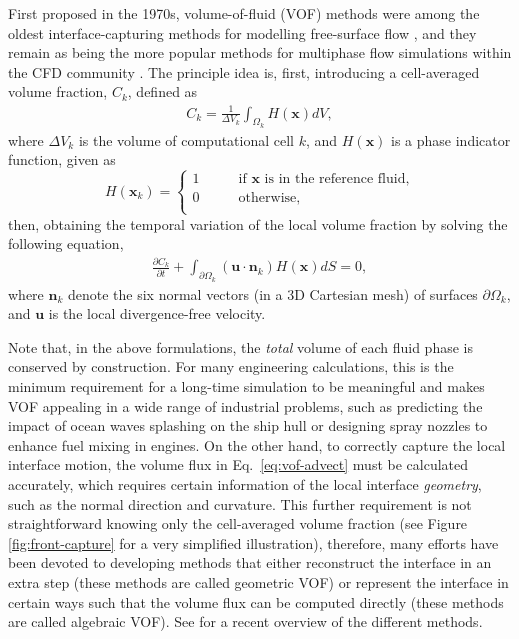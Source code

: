 First proposed in the 1970s, volume-of-fluid (VOF) methods were among the oldest interface-capturing methods for modelling free-surface flow \citep{Debar1974, hirt_nichols_1975, hirt_nichols_1981a}, and they remain as being the more popular methods for multiphase flow simulations within the CFD community \citep{Scardovelli_Zaleski_1999, gerris, pilliod_puckett_2004, xiao_honma_kono_2005a, mthinc2012, paris2019}.
The principle idea is, first, introducing a cell-averaged volume fraction, $C_{k}$, defined as
\begin{equation}
 \begin{aligned}
   C_{k} = \frac{1}{\Delta V_k} \int_{\Omega_k} H(\bm{x}) dV,
 \end{aligned}
\end{equation}
where $\Delta V_k$ is the volume of computational cell $k$, and $H(\bm{x})$ is a phase indicator function, given as
\begin{equation}
    H(\bm{x}_k)=
    \begin{cases}
        1 \quad \quad & \textrm{if $\bm{x}$ is in the reference fluid,} \\
        0 \quad & \textrm{otherwise}, \\
    \end{cases}
\end{equation}
then, obtaining the temporal variation of the local volume fraction by solving the following equation,
\begin{equation} \label{eq:vof-advect}
 \begin{aligned}
   \frac{\partial C_{k}}{\partial t} + \int_{\partial \Omega_k} (\bm{u \cdot n}_k) H(\bm{x}) dS =0,
 \end{aligned}
\end{equation}
where $\bm{n}_k$ denote the six normal vectors (in a 3D Cartesian mesh) of surfaces $\partial \Omega_k$, and $\bm u$ is the local divergence-free velocity.

Note that, in the above formulations, the \emph{total} volume of each fluid phase is conserved by construction.
For many engineering calculations, this is the minimum requirement for a long-time simulation to be meaningful and makes VOF appealing in a wide range of industrial problems, such as predicting the impact of ocean waves splashing on the ship hull or designing spray nozzles to enhance fuel mixing in engines.
On the other hand, to correctly capture the local interface motion, the volume flux in Eq.\ \eqref{eq:vof-advect} must be calculated accurately, which requires certain information of the local interface \emph{geometry}, such as the normal direction and curvature.
This further requirement is not straightforward knowing only the cell-averaged volume fraction (see Figure \ref{fig:front-capture} for a very simplified illustration), therefore, many efforts have been devoted to developing methods that either reconstruct the interface in an extra step (these methods are called geometric VOF) or represent the interface in certain ways such that the volume flux can be computed directly (these methods are called algebraic VOF). See \cite{mirjalili_jain_dodd_2017a} for a recent overview of the different methods.


